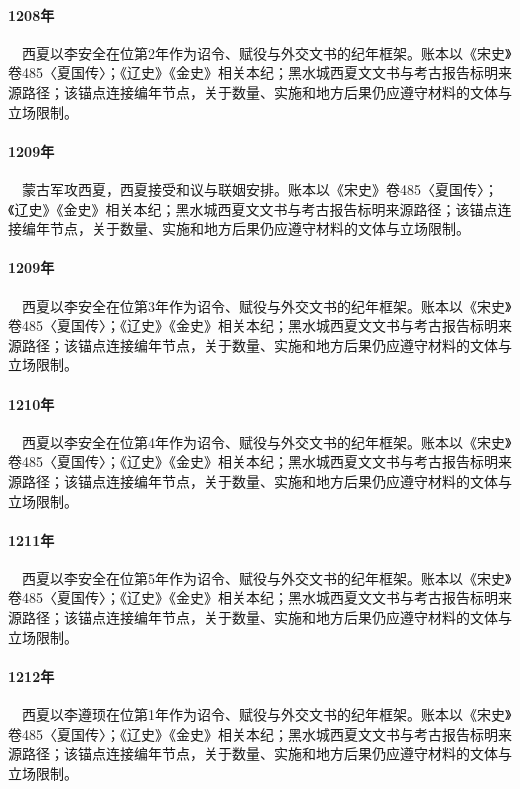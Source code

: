 \paragraph{1208年}　西夏以李安全在位第2年作为诏令、赋役与外交文书的纪年框架。账本以《宋史》卷485〈夏国传〉；《辽史》《金史》相关本纪；黑水城西夏文文书与考古报告标明来源路径；该锚点连接编年节点，关于数量、实施和地方后果仍应遵守材料的文体与立场限制。

\paragraph{1209年}　蒙古军攻西夏，西夏接受和议与联姻安排。账本以《宋史》卷485〈夏国传〉；《辽史》《金史》相关本纪；黑水城西夏文文书与考古报告标明来源路径；该锚点连接编年节点，关于数量、实施和地方后果仍应遵守材料的文体与立场限制。

\paragraph{1209年}　西夏以李安全在位第3年作为诏令、赋役与外交文书的纪年框架。账本以《宋史》卷485〈夏国传〉；《辽史》《金史》相关本纪；黑水城西夏文文书与考古报告标明来源路径；该锚点连接编年节点，关于数量、实施和地方后果仍应遵守材料的文体与立场限制。

\paragraph{1210年}　西夏以李安全在位第4年作为诏令、赋役与外交文书的纪年框架。账本以《宋史》卷485〈夏国传〉；《辽史》《金史》相关本纪；黑水城西夏文文书与考古报告标明来源路径；该锚点连接编年节点，关于数量、实施和地方后果仍应遵守材料的文体与立场限制。

\paragraph{1211年}　西夏以李安全在位第5年作为诏令、赋役与外交文书的纪年框架。账本以《宋史》卷485〈夏国传〉；《辽史》《金史》相关本纪；黑水城西夏文文书与考古报告标明来源路径；该锚点连接编年节点，关于数量、实施和地方后果仍应遵守材料的文体与立场限制。

\paragraph{1212年}　西夏以李遵顼在位第1年作为诏令、赋役与外交文书的纪年框架。账本以《宋史》卷485〈夏国传〉；《辽史》《金史》相关本纪；黑水城西夏文文书与考古报告标明来源路径；该锚点连接编年节点，关于数量、实施和地方后果仍应遵守材料的文体与立场限制。

